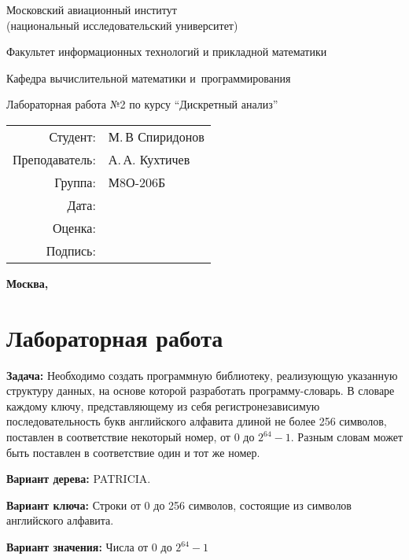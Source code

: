 \documentclass[pdf, unicode, 12pt, a4paper,oneside,fleqn]{article}
\newcommand{\CWHeader}[1]{\section*{#1}}
\newcommand{\CWProblem}[1]{\par\textbf{Задача: }#1}
\begin{document}
\begin{center}
\bfseries

{\Large Московский авиационный институт\\ (национальный исследовательский университет)

}

\vspace{48pt}

{\large Факультет информационных технологий и прикладной математики
}

\vspace{36pt}


{\large Кафедра вычислительной математики и~программирования

}


\vspace{48pt}

Лабораторная работа №2 по курсу \enquote{Дискретный анализ}

\end{center}

\vspace{72pt}

\begin{flushright}
\begin{tabular}{rl}
Студент: & М.\,В Спиридонов \\
Преподаватель: & А.\,А. Кухтичев \\
Группа: & М8О-206Б \\
Дата: & \\
Оценка: & \\
Подпись: & \\
\end{tabular}
\end{flushright}

\vfill
\pagestyle{empty}
\begin{center}
\bfseries
Москва, \the\year
\end{center}
\pagebreak

\CWHeader{Лабораторная работа }

\CWProblem{ 
Необходимо создать программную библиотеку, реализующую указанную структуру данных, на основе которой разработать программу-словарь. В словаре каждому ключу, представляющему из себя регистронезависимую последовательность букв английского алфавита длиной не более 256 символов, поставлен в соответствие некоторый номер, от $0$ до $2^{64} - 1$. Разным словам может быть поставлен в соответствие один и тот же номер.

{\bfseries Вариант дерева:} { PATRICIA.}

{\bfseries Вариант ключа:} {  Строки от 0 до 256 символов, состоящие из символов английского алфавита. }

{\bfseries Вариант значения:} { Числа от $0$ до $2^{64} - 1$}
}
\pagestyle{plain}
\pagebreak
\end{document}

